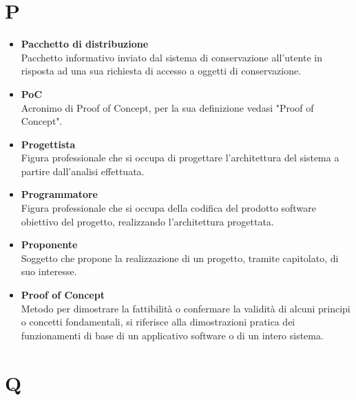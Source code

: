 \documentclass[a4paper,12pt]{article}
\begin{document}
        \section*{P} {
            \begin{itemize}
                \item \textbf{Pacchetto di distribuzione}\\
                    Pacchetto informativo inviato dal sistema di conservazione all’utente in risposta ad una sua richiesta di accesso a oggetti di conservazione.
                \item \textbf{PoC}\\
                    Acronimo di Proof of Concept, per la sua definizione vedasi "Proof of Concept".
                \item \textbf{Progettista}\\
                    Figura professionale che si occupa di progettare l'architettura del sistema a partire dall'analisi effettuata.
                \item \textbf{Programmatore}\\
                    Figura professionale che si occupa della codifica del prodotto software obiettivo del progetto, realizzando l'architettura progettata.
                \item \textbf{Proponente}\\
                    Soggetto che propone la realizzazione di un progetto, tramite capitolato, di suo interesse.
                \item \textbf{Proof of Concept}\\
                    Metodo per dimostrare la fattibilità o confermare la validità di alcuni principi o concetti fondamentali, si riferisce alla dimostrazioni pratica dei funzionamenti di base di un applicativo software o di un intero sistema.
            \end{itemize}
        }
        \newpage

        \section*{Q} {
            
        }
        \newpage
\end{document}
